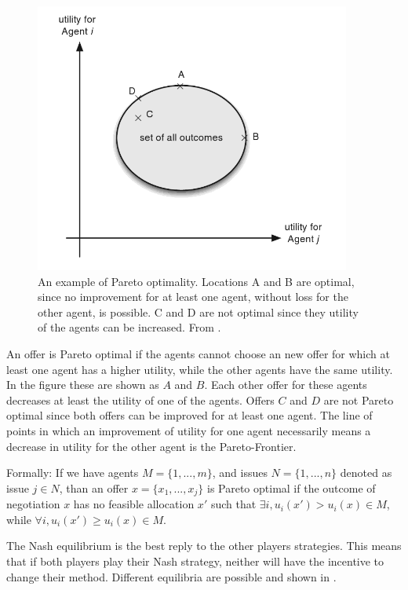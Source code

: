 \begin{figure}[h]
	\centering
	\includegraphics[width=0.7\linewidth]{img/parito_optimal.png}
	\caption{An example of Pareto optimality. Locations A and B are optimal, since no improvement for at least one agent, without loss for the other agent, is possible. C and D are not optimal since they utility of the agents can be increased. From \citet{fatima2014principles}.}
	\label{fig:paritooptimal}
\end{figure}

An offer is Pareto optimal if the agents cannot choose an new offer for which at least one agent has a higher utility, while the other agents have the same utility. In the figure these are shown as $A$ and $B$. Each other offer for these agents decreases at least the utility of one of the agents. Offers $C$ and $D$ are not Pareto optimal since both offers can be improved for at least one agent. The line of points in which an improvement of utility for one agent necessarily means a decrease in utility for the other agent is the Pareto-Frontier. 

Formally: If we have agents $M = \{1,...,m\}$, and issues $N = \{1,...,n\}$ denoted as issue $j\in N$, than an offer $x = \{x_1, ..., x_j\}$ is Pareto optimal if the outcome of negotiation $x$ has no feasible allocation $x'$ such that $ \exists i, u_i(x')> u_i(x) \in M$, while $\forall i, u_i(x')\geq u_i(x)  \in M$. 

The Nash equilibrium is the best reply to the other players strategies. This means that if both players play their Nash strategy, neither will have the incentive to change their method. Different equilibria are possible and shown in . 

